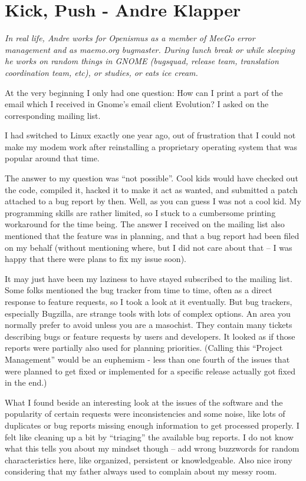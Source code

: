 \chapter{Kick, Push - Andre Klapper}

\textit{In real life, Andre works for Openismus as a member of MeeGo error
management and as maemo.org bugmaster. During lunch break or while
sleeping he works on random things in GNOME (bugsquad, release team,
translation coordination team, etc), or studies, or eats ice cream.}

At the very beginning I only had one question: How can I print a part of the
email which I received in Gnome's email client Evolution? I asked on the
corresponding mailing list.

I had switched to Linux exactly one year ago, out of frustration that I
could not make my modem work after reinstalling a proprietary operating system
that was popular around that time.

The answer to my question was ``not possible''. Cool kids would have checked out
the code, compiled it, hacked it to make it act as wanted, and submitted a patch
attached to a bug report by then. Well, as you can guess I was not a cool kid.
My programming skills are rather limited, so I stuck to a cumbersome printing
workaround for the time being. The answer I received on the mailing list also
mentioned that the feature was in planning, and that a bug report had been filed
on my behalf (without mentioning where, but I did not care about that -- I was
happy that there were plans to fix my issue soon).

It may just have been my laziness to have stayed subscribed to the mailing list.
Some folks mentioned the bug tracker from time to time, often as a direct
response to feature requests, so I took a look at it eventually. But bug
trackers, especially Bugzilla, are strange tools with lots of complex options.
An area you normally prefer to avoid unless you are a masochist. They contain
many tickets describing bugs or feature requests by users and developers. It
looked as if those reports were partially also used for planning priorities.
(Calling this ``Project Management'' would be an euphemism - less than one
fourth of the issues that were planned to get fixed or implemented for a
specific release actually got fixed in the end.)

What I found beside an interesting look at the issues of the software and the
popularity of certain requests were inconsistencies and some noise, like lots of
duplicates or bug reports missing enough information to get processed properly.
I felt like cleaning up a bit by ``triaging'' the available bug reports. I do
not know what this tells you about my mindset though -- add wrong buzzwords for
random characteristics here, like organized, persistent or knowledgeable. Also
nice irony considering that my father always used to complain about my messy
room.

